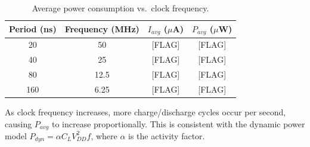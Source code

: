 \documentclass[12pt, a4paper]{article}
\begin{document}
\begin{table}[H]
    \centering
    \caption{Average power consumption vs.\ clock frequency.}
    \label{tab:dlatch_power_freq}
    \begin{tabular}{cccc}
        \toprule
        Period (ns) & Frequency (MHz) & $I_{avg}$ ($\mu$A) & $P_{avg}$ ($\mu$W) \\
        \midrule
        20  & 50   & [FLAG] & [FLAG] \\
        40  & 25   & [FLAG] & [FLAG] \\
        80  & 12.5 & [FLAG] & [FLAG] \\
        160 & 6.25 & [FLAG] & [FLAG] \\
        \bottomrule
    \end{tabular}
\end{table}

As clock frequency increases, more charge/discharge cycles occur per second, causing $P_{avg}$ to increase proportionally. This is consistent with the dynamic power model $P_{dyn} = \alpha C_L V_{DD}^2 f$, where $\alpha$ is the activity factor.
\end{document}
